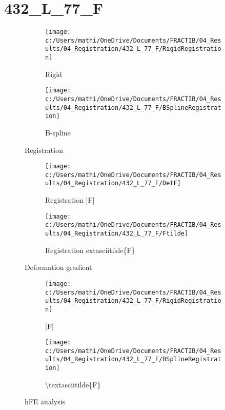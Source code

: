 \documentclass{article}%
\begin{document}
%
\normalsize%
\section*{432\_L\_77\_F}%
\label{sec:432L77F}%


\begin{figure}[h!]%
\begin{subfigure}[b]{0.5\linewidth}%
\texttt{[image: c:/Users/mathi/OneDrive/Documents/FRACTIB/04\_Results/04\_Registration/432\_L\_77\_F/RigidRegistration]}%
\caption{Rigid}%
\end{subfigure}%
\begin{subfigure}[b]{0.5\linewidth}%
\texttt{[image: c:/Users/mathi/OneDrive/Documents/FRACTIB/04\_Results/04\_Registration/432\_L\_77\_F/BSplineRegistration]}%
\caption{B{-}spline}%
\end{subfigure}%
\caption{Registration}%
\end{figure}

%


\begin{figure}[h!]%
\begin{subfigure}[b]{0.5\linewidth}%
\texttt{[image: c:/Users/mathi/OneDrive/Documents/FRACTIB/04\_Results/04\_Registration/432\_L\_77\_F/DetF]}%
\caption{Registration |F|}%
\end{subfigure}%
\begin{subfigure}[b]{0.5\linewidth}%
\texttt{[image: c:/Users/mathi/OneDrive/Documents/FRACTIB/04\_Results/04\_Registration/432\_L\_77\_F/Ftilde]}%
\caption{Registration 	extasciitilde\{F\}}%
\end{subfigure}%
\caption{Deformation gradient}%
\end{figure}

%


\begin{figure}[h!]%
\begin{subfigure}[b]{0.5\linewidth}%
\texttt{[image: c:/Users/mathi/OneDrive/Documents/FRACTIB/04\_Results/04\_Registration/432\_L\_77\_F/RigidRegistration]}%
\caption{|F|}%
\end{subfigure}%
\begin{subfigure}[b]{0.5\linewidth}%
\texttt{[image: c:/Users/mathi/OneDrive/Documents/FRACTIB/04\_Results/04\_Registration/432\_L\_77\_F/BSplineRegistration]}%
\caption{\textbackslash{}textasciitilde\{F\}}%
\end{subfigure}%
\caption{hFE analysis}%
\end{figure}

%
\newpage%
\end{document}
